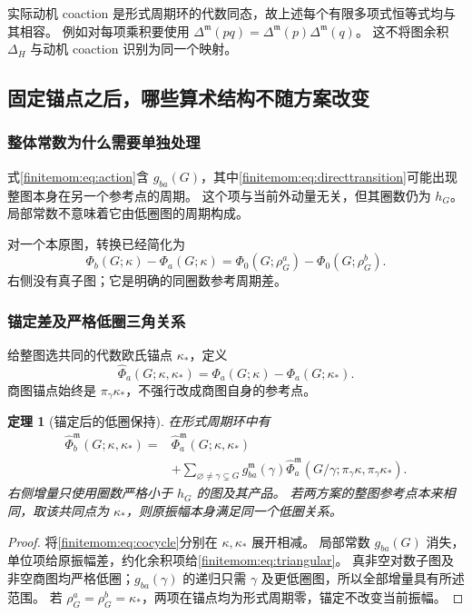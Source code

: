 \documentclass[11pt,a4paper,oneside]{ctexart}
\theoremstyle{cnplain}
\newtheorem{theorem}{定理}[section]
\theoremstyle{definition}
\theoremstyle{remark}
\numberwithin{equation}{section}
\begin{document}
实际动机 coaction 是形式周期环的代数同态，故上述每个有限多项式恒等式均与其相容。
例如对每项乘积要使用 $\Delta^{\mathfrak m}(pq)=\Delta^{\mathfrak m}(p)\Delta^{\mathfrak m}(q)$。
这不将图余积 $\Delta_H$ 与动机 coaction 识别为同一个映射。


\subsection{固定锚点之后，哪些算术结构不随方案改变}
\subsubsection{整体常数为什么需要单独处理}
式\eqref{finitemom:eq:action}含 $g_{ba}(G)$，其中\eqref{finitemom:eq:directtransition}可能出现整图本身在另一个参考点的周期。
这个项与当前外动量无关，但其圈数仍为 $h_G$。
局部常数不意味着它由低圈图的周期构成。

对一个本原图，转换已经简化为
\begin{equation}\label{finitemom:eq:primitive}
 \Phi_b(G;\kappa)-\Phi_a(G;\kappa)
   =\Phi_0(G;\rho_G^a)-\Phi_0(G;\rho_G^b).
\end{equation}
右侧没有真子图；它是明确的同圈数参考周期差。

\subsubsection{锚定差及严格低圈三角关系}
给整图选共同的代数欧氏锚点 $\kappa_*$，定义
\begin{equation}\label{finitemom:eq:anchor}
 \widehat\Phi_a(G;\kappa,\kappa_*)
       =\Phi_a(G;\kappa)-\Phi_a(G;\kappa_*).
\end{equation}
商图锚点始终是 $\pi_\gamma\kappa_*$，不强行改成商图自身的参考点。

\begin{theorem}[锚定后的低圈保持]\label{finitemom:thm:anchor}
在形式周期环中有
\begin{align}\label{finitemom:eq:triangular}
 \widehat\Phi_b^{\mathfrak m}(G;\kappa,\kappa_*)
 ={}&\widehat\Phi_a^{\mathfrak m}(G;\kappa,\kappa_*)\nonumber\\
 &+\sum_{\varnothing\ne\gamma\subsetneq G}
 g_{ba}^{\mathfrak m}(\gamma)
 \widehat\Phi_a^{\mathfrak m}
       (G/\gamma;\pi_\gamma\kappa,\pi_\gamma\kappa_*).
\end{align}
右侧增量只使用圈数严格小于 $h_G$ 的图及其产品。
若两方案的整图参考点本来相同，取该共同点为 $\kappa_*$，则原振幅本身满足同一个低圈关系。
\end{theorem}
\begin{proof}
将\eqref{finitemom:eq:cocycle}分别在 $\kappa,\kappa_*$ 展开相减。
局部常数 $g_{ba}(G)$ 消失，单位项给原振幅差，约化余积项给\eqref{finitemom:eq:triangular}。
真非空对数子图及非空商图均严格低圈；$g_{ba}(\gamma)$ 的递归只需 $\gamma$ 及更低圈图，所以全部增量具有所述范围。
若 $\rho_G^a=\rho_G^b=\kappa_*$，两项在锚点均为形式周期零，锚定不改变当前振幅。
\end{proof}
\end{document}

